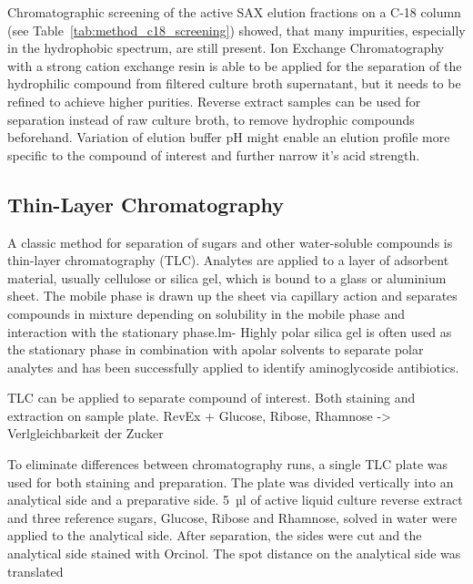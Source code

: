 Chromatographic screening of the active SAX elution fractions on a C-18 column (see Table~\ref{tab:method_c18_screening}) showed, that many impurities, especially in the hydrophobic spectrum, are still present.
Ion Exchange Chromatography with a strong cation exchange resin is able to be applied for the separation of the hydrophilic compound from filtered culture broth supernatant, but it needs to be refined to achieve higher purities.
Reverse extract samples can be used for separation instead of raw culture broth, to remove hydrophic compounds beforehand.
Variation of elution buffer pH might enable an elution profile more specific to the compound of interest and further narrow it's acid strength.



\subsection{Thin-Layer Chromatography} %
\label{sub:results_thin_layer_chromatography}


A classic method for separation of sugars and other water-soluble compounds is thin-layer chromatography (TLC).
Analytes are applied to a layer of adsorbent material, usually cellulose or silica gel, which is bound to a glass or aluminium sheet.
The mobile phase is drawn up the sheet via capillary action and separates compounds in mixture depending on solubility in the mobile phase and interaction with the stationary phase.lm-
Highly polar silica gel is often used as the stationary phase in combination with apolar solvents to separate polar analytes and has been successfully applied to identify aminoglycoside antibiotics.\autocite{Pauncz1980}

TLC can be applied to separate compound of interest. Both staining and extraction on sample plate. RevEx + Glucose, Ribose, Rhamnose -> Verlgleichbarkeit der Zucker

To eliminate differences between chromatography runs, a single TLC plate was used for both staining and preparation.
The plate was divided vertically into an analytical side and a preparative side.
5~µl of active liquid culture reverse extract and three reference sugars, Glucose, Ribose and Rhamnose, solved in water were applied to the analytical side.
After separation, the sides were cut and the analytical side stained with Orcinol.
The spot distance on the analytical side was translated 

